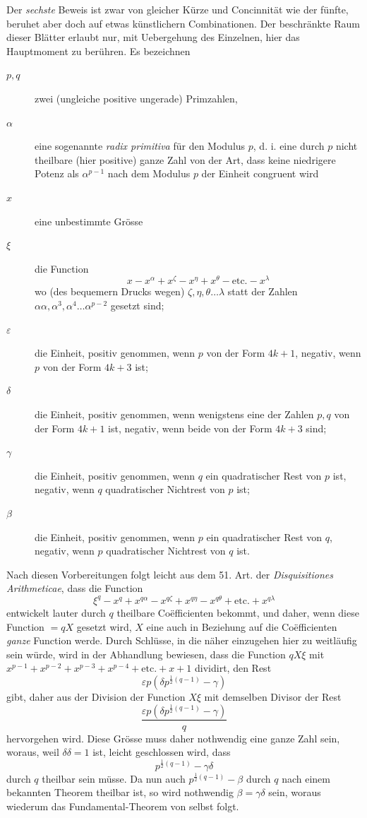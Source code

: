 Der \emph{sechste} Beweis ist zwar von gleicher Kürze und Concinnität wie der fünfte, beruhet aber doch auf etwas künstlichern Combinationen. Der beschränkte Raum dieser Blätter erlaubt nur, mit Uebergehung des Einzelnen, hier das Hauptmoment zu berühren. Es bezeichnen
\begin{description}
\item[$p,q$] zwei (ungleiche positive ungerade) Primzahlen,
\item[$\alpha$] eine sogenannte \emph{radix primitiva} für den Modulus $p$, d. i. eine durch $p$ nicht theilbare (hier positive) ganze Zahl von der Art, dass keine niedrigere Potenz als $\alpha^{p-1}$ nach dem Modulus $p$ der Einheit congruent wird
\item[$x$] eine unbestimmte Grösse
%
\item[$\xi$] die Function
\[
x-x^\alpha+x^\zeta-x^\eta+x^\theta-\text{etc.}-x^\lambda
\]
wo (des bequemern Drucks wegen) $\zeta,\eta,\theta\ldots\lambda$ statt der Zahlen $\alpha\alpha,\allowbreak \alpha^3,\allowbreak \alpha^4\ldots\allowbreak \alpha^{p-2}$ gesetzt sind;
\item[$\varepsilon$] die Einheit, positiv genommen, wenn $p$ von der Form $4k+1$, negativ, wenn $p$ von der Form $4k+3$ ist;
\item[$\delta$] die Einheit, positiv genommen, wenn wenigstens eine der Zahlen $p,q$ von der Form $4k+1$ ist, negativ, wenn beide von der Form $4k+3$ sind;
\item[$\gamma$] die Einheit, positiv genommen, wenn $q$ ein quadratischer Rest von $p$ ist, negativ, wenn $q$ quadratischer Nichtrest von $p$ ist;
\item[$\beta$] die Einheit, positiv genommen, wenn $p$ ein quadratischer Rest von $q$, negativ, wenn $p$ quadratischer Nichtrest von $q$ ist.
\end{description}

Nach diesen Vorbereitungen folgt leicht aus dem 51. Art. der \emph{Disquisitiones Arithmeticae}, dass die Function
\[
\xi^q-x^q+x^{q\alpha}-x^{q\zeta}+x^{q\eta}-x^{q\theta}+\text{etc.}+x^{q\lambda}
\]
entwickelt lauter durch $q$ theilbare Coëfficienten bekommt, und daher, wenn diese Function $=qX$ gesetzt wird, $X$ eine auch in Beziehung auf die Coëfficienten \emph{ganze} Function werde. Durch Schlüsse, in die näher einzugehen hier zu weitläufig sein würde, wird in der Abhandlung bewiesen, dass die Function $qX\xi$ mit $x^{p-1}+x^{p-2}+x^{p-3}+x^{p-4}+\text{etc.}+x+1$ dividirt, den Rest
\[
\varepsilon p(\delta p^{\frac12(q-1)}-\gamma)
\]
gibt, daher aus der Division der Function $X\xi$ mit demselben Divisor der Rest
\[
\frac{\varepsilon p(\delta p^{\frac12(q-1)}-\gamma)}{q}
\]
hervorgehen wird. Diese Grösse muss daher nothwendig eine ganze Zahl sein, woraus, weil $\delta\delta=1$ ist, leicht geschlossen wird, dass
\[
p^{\frac12(q-1)}-\gamma\delta
\]
durch $q$ theilbar sein müsse. Da nun auch $p^{\frac12(q-1)}-\beta$ durch $q$ nach einem bekannten Theorem theilbar ist, so wird nothwendig $\beta=\gamma\delta$ sein, woraus wiederum das Fundamental-Theorem von selbst folgt.

